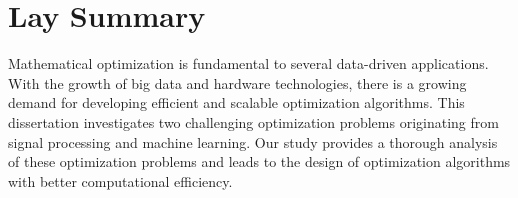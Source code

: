 

\chapter{Lay Summary}

Mathematical optimization is fundamental to several data-driven applications. With the growth of big data and hardware technologies, there is a growing demand for developing efficient and scalable optimization algorithms. This dissertation investigates two challenging optimization problems originating from signal processing and machine learning. Our study provides a thorough analysis of these optimization problems and leads to the design of optimization algorithms with better computational efficiency.
